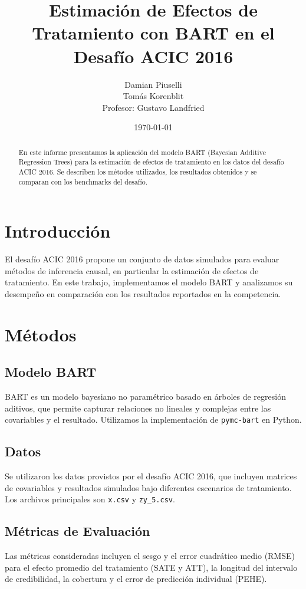 \documentclass[a4paper,12pt]{article}
\title{Estimación de Efectos de Tratamiento con BART en el Desafío ACIC 2016}
\author{Damian Piuselli \\ Tomás Korenblit \\ Profesor: Gustavo Landfried}
\date{\today}
\begin{document}
\maketitle

\begin{abstract}
En este informe presentamos la aplicación del modelo BART (Bayesian Additive Regression Trees) para la estimación de efectos de tratamiento en los datos del desafío ACIC 2016. Se describen los métodos utilizados, los resultados obtenidos y se comparan con los benchmarks del desafío.\end{abstract}

\section{Introducción}
El desafío ACIC 2016 propone un conjunto de datos simulados para evaluar métodos de inferencia causal, en particular la estimación de efectos de tratamiento. En este trabajo, implementamos el modelo BART y analizamos su desempeño en comparación con los resultados reportados en la competencia.

\section{Métodos}
\subsection{Modelo BART}
BART es un modelo bayesiano no paramétrico basado en árboles de regresión aditivos, que permite capturar relaciones no lineales y complejas entre las covariables y el resultado. Utilizamos la implementación de \texttt{pymc-bart} en Python.

\subsection{Datos}
Se utilizaron los datos provistos por el desafío ACIC 2016, que incluyen matrices de covariables y resultados simulados bajo diferentes escenarios de tratamiento. Los archivos principales son \texttt{x.csv} y \texttt{zy\_5.csv}.

\subsection{Métricas de Evaluación}
Las métricas consideradas incluyen el sesgo y el error cuadrático medio (RMSE) para el efecto promedio del tratamiento (SATE y ATT), la longitud del intervalo de credibilidad, la cobertura y el error de predicción individual (PEHE).
\end{document}
